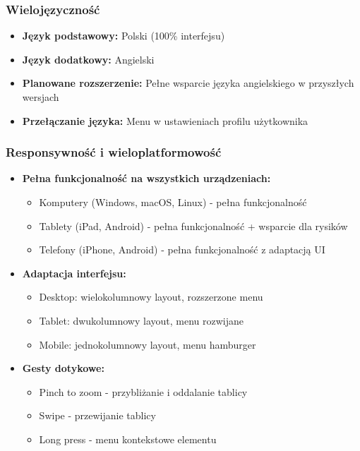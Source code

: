 \documentclass[12pt,a4paper]{article}
\begin{document}
\subsubsection{Wielojęzyczność}

\begin{itemize}[leftmargin=*]
    \item \textbf{Język podstawowy:} Polski (100\% interfejsu)
    \item \textbf{Język dodatkowy:} Angielski
    \item \textbf{Planowane rozszerzenie:} Pełne wsparcie języka angielskiego w przyszłych wersjach
    \item \textbf{Przełączanie języka:} Menu w ustawieniach profilu użytkownika
\end{itemize}

\subsubsection{Responsywność i wieloplatformowość}

\begin{itemize}[leftmargin=*]
    \item \textbf{Pełna funkcjonalność na wszystkich urządzeniach:}
    \begin{itemize}
        \item Komputery (Windows, macOS, Linux) - pełna funkcjonalność
        \item Tablety (iPad, Android) - pełna funkcjonalność + wsparcie dla rysików
        \item Telefony (iPhone, Android) - pełna funkcjonalność z adaptacją UI
    \end{itemize}
    \item \textbf{Adaptacja interfejsu:}
    \begin{itemize}
        \item Desktop: wielokolumnowy layout, rozszerzone menu
        \item Tablet: dwukolumnowy layout, menu rozwijane
        \item Mobile: jednokolumnowy layout, menu hamburger
    \end{itemize}
    \item \textbf{Gesty dotykowe:}
    \begin{itemize}
        \item Pinch to zoom - przybliżanie i oddalanie tablicy
        \item Swipe - przewijanie tablicy
        \item Long press - menu kontekstowe elementu
    \end{itemize}
\end{itemize}
\end{document}
